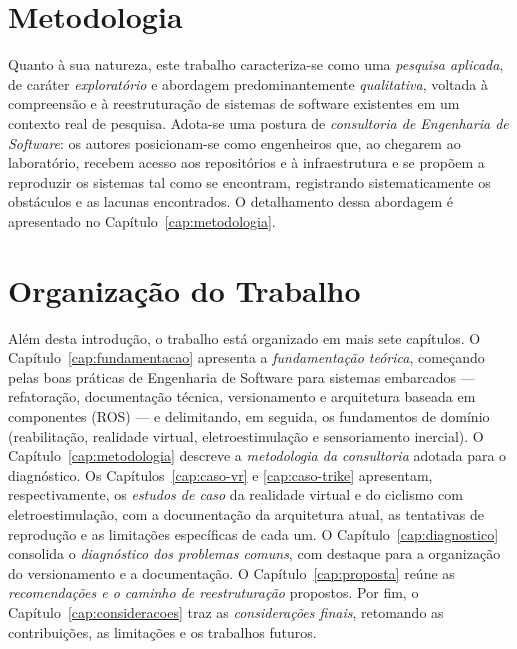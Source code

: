 \section{Metodologia}
\label{sec:metodologia-intro}

Quanto à sua natureza, este trabalho caracteriza-se como uma \emph{pesquisa aplicada}, de
caráter \emph{exploratório} e abordagem predominantemente \emph{qualitativa}, voltada à
compreensão e à reestruturação de sistemas de software existentes em um contexto real de
pesquisa. Adota-se uma postura de \emph{consultoria de Engenharia de Software}: os autores
posicionam-se como engenheiros que, ao chegarem ao laboratório, recebem acesso aos
repositórios e à infraestrutura e se propõem a reproduzir os sistemas tal como se
encontram, registrando sistematicamente os obstáculos e as lacunas encontrados. O
detalhamento dessa abordagem é apresentado no Capítulo~\ref{cap:metodologia}.

\section{Organização do Trabalho}
\label{sec:organizacao}

Além desta introdução, o trabalho está organizado em mais sete capítulos. O
Capítulo~\ref{cap:fundamentacao} apresenta a \emph{fundamentação teórica}, começando pelas
boas práticas de Engenharia de Software para sistemas embarcados --- refatoração,
documentação técnica, versionamento e arquitetura baseada em componentes (ROS) --- e
delimitando, em seguida, os fundamentos de domínio (reabilitação, realidade virtual,
eletroestimulação e sensoriamento inercial). O Capítulo~\ref{cap:metodologia} descreve a
\emph{metodologia da consultoria} adotada para o diagnóstico. Os
Capítulos~\ref{cap:caso-vr} e \ref{cap:caso-trike} apresentam, respectivamente, os
\emph{estudos de caso} da realidade virtual e do ciclismo com eletroestimulação, com a
documentação da arquitetura atual, as tentativas de reprodução e as limitações específicas
de cada um. O Capítulo~\ref{cap:diagnostico} consolida o \emph{diagnóstico dos problemas
comuns}, com destaque para a organização do versionamento e a documentação. O
Capítulo~\ref{cap:proposta} reúne as \emph{recomendações e o caminho de reestruturação}
propostos. Por fim, o Capítulo~\ref{cap:consideracoes} traz as \emph{considerações finais},
retomando as contribuições, as limitações e os trabalhos futuros.
